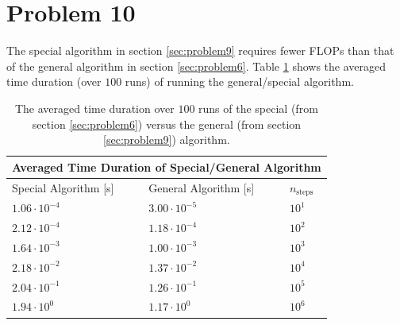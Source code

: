 \documentclass[english,notitlepage,reprint,nofootinbib]{revtex4-2}  %
\begin{document}
\section{Problem 10}
The special algorithm in section \ref{sec:problem9} requires fewer FLOPs than that of the general algorithm in section \ref{sec:problem6}. Table \ref{table:timings} shows the averaged time duration (over \(100\) runs) of running the general/special algorithm.
\begin{table}[h!]
    \centering
\begin{tabular}{ |p{3.3cm}|p{3.3cm}|p{1cm}| }
 \hline
 \multicolumn{3}{|c|}{Averaged Time Duration of Special/General Algorithm} \\
 \hline
 Special Algorithm [s] & General Algorithm [s] & \(n_{\text{steps}}\)\\
 \hline
 \(1.06 \cdot 10^{-4}\) & \(3.00 \cdot 10^{-5}\) & \(10^{1}\) \\
 \(2.12 \cdot 10^{-4}\) & \(1.18 \cdot 10^{-4}\) & \(10^{2}\) \\
 \(1.64 \cdot 10^{-3}\) & \(1.00 \cdot 10^{-3}\) & \(10^{3}\) \\
 \(2.18 \cdot 10^{-2}\) & \(1.37 \cdot 10^{-2}\) & \(10^{4}\) \\
 \(2.04 \cdot 10^{-1}\) & \(1.26 \cdot 10^{-1}\) & \(10^{5}\) \\
 \(1.94 \cdot 10^{0}\)  & \(1.17 \cdot 10^{0}\)  & \(10^{6}\)
\end{tabular}
\label{table:timings}
\caption{The averaged time duration over \(100\) runs of the special (from section \ref{sec:problem6}) versus the general (from section \ref{sec:problem9}) algorithm. }
\end{table}

\onecolumngrid
% 


\end{document}
